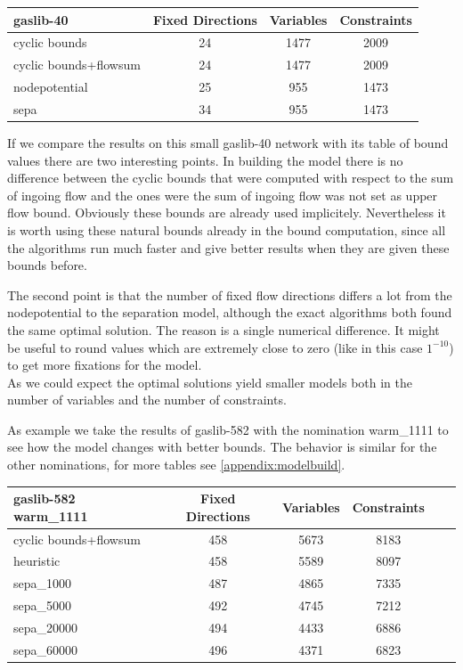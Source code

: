 \begin{center}
\begin{tabular}{ l | c | c | c }
\textbf{gaslib-40} & Fixed Directions & Variables&Constraints\\
\hline
 cyclic bounds&24 &1477&2009 \\
 cyclic bounds+flowsum &24 & 1477 &2009 \\
 nodepotential& 25 &955 &1473  \\ 
 sepa& 34 &955 &1473 \\
\end{tabular} 
\end{center}
If we compare the results on this small gaslib-40 network with its table of bound values there are two interesting 
points. In building the model there is no difference between the cyclic bounds that were computed with respect to the 
sum of ingoing flow and the ones were the sum of ingoing flow was not set as upper flow bound. Obviously these bounds 
are already used implicitely. Nevertheless it is worth using these natural bounds already in the bound computation, 
since all the algorithms run much faster and give better results when they are given these bounds before. 

The second point is that the number of fixed flow directions differs a lot from the nodepotential to the separation 
model, although the exact algorithms both found the same optimal solution. The reason is a single numerical difference. 
It might be useful to round values which are extremely close to zero (like in this case $1^{-10}$) to get more 
fixations for the model.\\

As we could expect the optimal solutions yield smaller models both in the number of variables and the number of 
constraints. 

As example we take the results of gaslib-582 with the nomination warm\_1111 to see how the model changes with better 
bounds. The behavior is similar for the other nominations, for more tables see \ref{appendix:modelbuild}.
\begin{center}
\begin{tabular}{ l | c | c | c | c | c }

\textbf{gaslib-582 warm\_1111} & Fixed Directions &Variables &Constraints\\
\hline
 cyclic bounds+flowsum& 458 & 5673 &8183 \\
 heuristic& 458& 5589 &8097\\
 sepa\_1000& 487 & 4865 & 7335 \\
 sepa\_5000& 492& 4745 & 7212  \\
 sepa\_20000& 494 & 4433& 6886 \\
 sepa\_60000& 496 & 4371 & 6823 \\
\end{tabular} 
\end{center}

